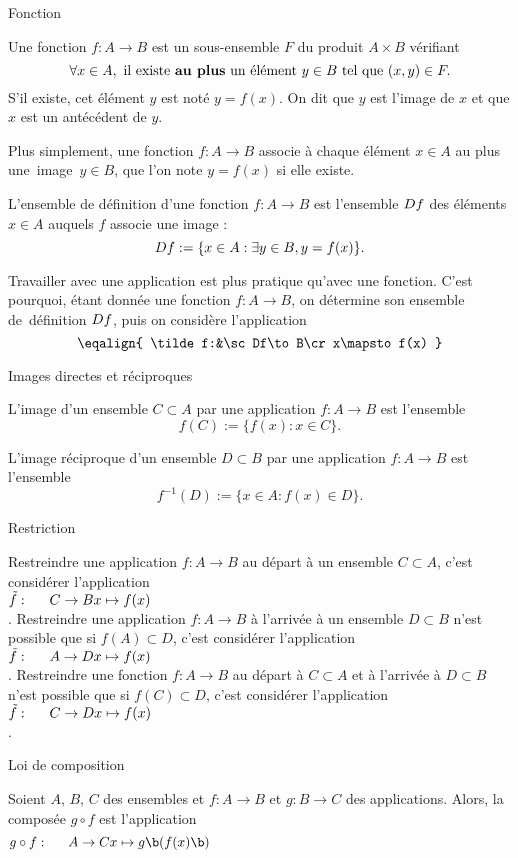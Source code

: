 \Concept [] Fonction

\Definition []  Une fonction $f:A\to B$ est un sous-ensemble $F$ du produit $A\times B$ v\'erifiant 
$$
\forall x\in A, \mbox{ il existe {\bf au plus} un \'el\'ement }y\in B\mbox{ tel que }(x,y)\in F. 
$$
S'il existe, cet \'el\'ement $y$ est not\'e $y=f(x)$. On dit que $y$ est l'image de $x$ et que $x$ est un ant\'ec\'edent de $y$. 

\bigskip
\noindent
Plus simplement, une fonction $f:A\to B$ associe \`a chaque \'el\'ement $x\in A$ au plus une~image~$y\in B$, que l'on note $y=f(x)$ si elle existe. 
\bigskip

\Definition []  L'ensemble de d\'efinition d'une fonction $f:A\to B$ est l'ensemble $\sc Df$ des \'el\'ements $x\in A$ auquels $f$ associe une image : 
$$
{
\sc Df:=\{x\in A:\exists y\in B, y=f(x)\}}.
$$


Travailler avec une application est plus pratique qu'avec une fonction. 
C'est pourquoi, \'etant donn\'ee une fonction $f:A\to B$, on d\'etermine son ensemble de~d\'efinition $\sc Df$, puis on consid\`ere l'application 
$$
\eqalign{
	\tilde f:&\sc Df\to B\cr
	x\mapsto f(x)
}
$$

\Concept [] Images directes et r\'eciproques

\Definition []  L'image  d'un ensemble  $C\subset A$  par une application $f:A\to B$ est l'ensemble 
$$
f(C):=\{f(x):x\in C\}.
$$

\Definition []  L'image r\'eciproque  d'un ensemble  $D\subset B$  par une application $f:A\to B$ est l'ensemble 
$$
f^{-1}(D):=\{x\in A:f(x)\in D\}.
$$


\Concept [] Restriction

\noindent
Restreindre une application $f:A\to B$ au d\'epart \`a un ensemble $C\subset A$, c'est consid\'erer l'application $\tilde f:\vtop{\mbox{$C\to B$}\mbox{$x\mapsto f(x)$}}$.
\bigskip
\noindent
Restreindre une application $f:A\to B$ \`a l'arriv\'ee \`a un ensemble $D\subset B$ n'est possible que si $f(A)\subset D$, c'est consid\'erer l'application $\tilde f:\vtop{\mbox{$A\to D$}\mbox{$x\mapsto f(x)$}}$.
\bigskip
\noindent
Restreindre  une  fonction  $f:A\to B$ au d\'epart \`a $C\subset A$ et \`a l'arriv\'ee \`a $D\subset B$ n'est possible que si
$f(C)\subset D$, c'est consid\'erer l'application $\tilde f:\vtop{\mbox{$C\to D$}\mbox{$x\mapsto f(x)$}}$.


\Concept [] Loi de composition

\Definition []  Soient $A$, $B$, $C$ des ensembles et $f:A\to B$ et $g:B\to C$ des applications. Alors, la compos\'ee $g\circ f$ est l'application 
$$
g\circ f:\vtop{\mbox{$A\to C$}\mbox{$x\mapsto g\b(f(x)\b)$}}
$$

